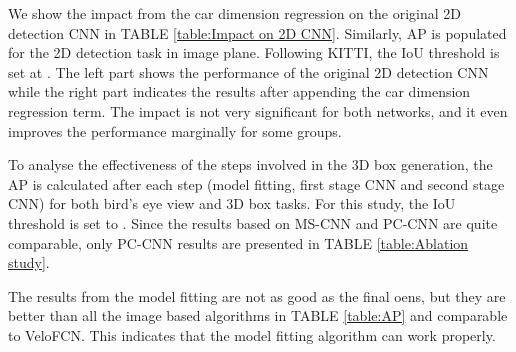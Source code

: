 \documentclass[letterpaper, 10 pt, conference]{ieeeconf}  \usepackage[
\begin{document}
  We show the impact from the car dimension regression on the original 2D detection CNN in TABLE \ref{table:Impact on 2D CNN}. Similarly, AP is populated for the 2D detection task in image plane. Following KITTI, the IoU threshold is set at . The left part shows the performance of the original 2D detection CNN while the right part indicates the results after appending the car dimension regression term. The impact is not very significant for both networks, and it even improves the performance marginally for some groups.

\begin{table}[h]
\centering
\caption{Impact on the original 2D detection CNN from appending the car dimension regression term.}
\label{table:Impact on 2D CNN}
\end{table}

 To analyse the effectiveness of the steps involved in the 3D box generation, the AP is calculated after each step (model fitting, first stage CNN and second stage CNN) for both bird's eye view and 3D box tasks. For this study, the IoU threshold is set to . Since the results based on MS-CNN and PC-CNN are quite comparable, only PC-CNN results are presented in TABLE \ref{table:Ablation study}. 

The results from the model fitting are not as good as the final oens, but they are better than all the image based algorithms  in TABLE \ref{table:AP} and comparable to VeloFCN. This indicates that the model fitting algorithm can work properly. 

\begin{table}[h]
\centering
\caption{Ablation study based on KITTI validation set. Numbers indicate AP with IoU threshold at 0.5.}
\label{table:Ablation study}
\end{table}
\end{document}

